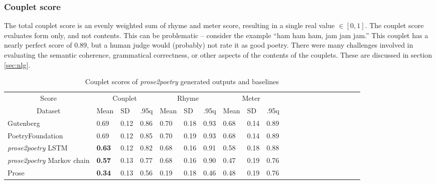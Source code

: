 \documentclass[11pt,a4paper]{article}
\begin{document}
\subsubsection{Couplet score}
\label{sec:coupletscore}

The total couplet score is an evenly weighted sum of rhyme and meter score, resulting in a single real value $\in [0, 1]$.
 The couplet score evaluates form only, and not contents. This can be problematic -- consider the example ``ham ham ham, jam jam jam.'' This couplet has a nearly perfect score of 0.89, but a human judge would (probably) not rate it as good poetry. There were many challenges involved in evaluating the semantic coherence, grammatical correctness, or other aspects of the contents of the couplets. These are discussed in section \ref{sec:nlg}.

\begin{table}[ht]
\begin{tabular}{|l|l|l|l|l|l|l|l|l|l|l|c|c|c|c|c|c|c|c|c|c|}
\hline\hline
\multicolumn{1}{|c|}{Score} & \multicolumn{3}{c|}{Couplet} & \multicolumn{3}{c|}{Rhyme} & \multicolumn{3}{c|}{Meter}\\
\cline{1-10}
\multicolumn{1}{|c|}{Dataset} & Mean & SD & .95q & Mean & SD & .95q & Mean & SD & .95q \\
\hline\hline
Gutenberg & 0.69 & 0.12 & 0.86 & 0.70 & 0.18 & 0.93 & 0.68 & 0.14 & 0.89 \\ [0.5ex]
\hline
PoetryFoundation & 0.69 & 0.12 & 0.85 & 0.70 & 0.19 & 0.93 & 0.68 & 0.14 & 0.89 \\ [0.5ex]
\hline
\textit{prose2poetry} LSTM & \textbf{0.63} & 0.12 & 0.82 & 0.68 & 0.16 & 0.91 & 0.58 & 0.18 & 0.88 \\ [0.5ex]
\hline
\textit{prose2poetry} Markov chain & \textbf{0.57} & 0.13 & 0.77 & 0.68 & 0.16 & 0.90 & 0.47 & 0.19 & 0.76 \\ [0.5ex]
\hline
Prose & \textbf{0.34} & 0.13 & 0.56 & 0.19 & 0.18 & 0.46 & 0.48 & 0.19 & 0.76 \\ [0.5ex]
\hline
\end{tabular}

\caption{Couplet scores of \textit{prose2poetry} generated outputs and baselines}
\label{table:couplet_results}
\end{table}
\end{document}
